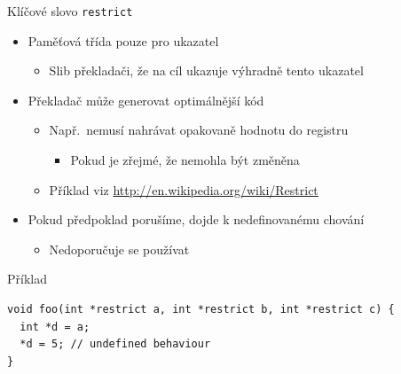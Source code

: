 \begin{frame}[fragile]{Klíčové slovo \texttt{restrict}}

  \begin{itemize}
    \item Paměťová třída pouze pro ukazatel
    \begin{itemize}
      \item Slib překladači, že na cíl ukazuje výhradně tento ukazatel
    \end{itemize}

    \pause

    \item Překladač může generovat optimálnější kód
    \begin{itemize}
      \item Např.\ nemusí nahrávat opakovaně hodnotu do registru
      \begin{itemize}
	\item Pokud je zřejmé, že nemohla být změněna
      \end{itemize}

      \item Příklad viz \url{http://en.wikipedia.org/wiki/Restrict}
    \end{itemize}

    \pause

    \item Pokud předpoklad porušíme, dojde k nedefinovanému chování
    \begin{itemize}
      \item Nedoporučuje se používat
    \end{itemize}

  \end{itemize}


\begin{block}{Příklad}
\begin{lstlisting}
void foo(int *restrict a, int *restrict b, int *restrict c) {
  int *d = a;
  *d = 5; // undefined behaviour
}
\end{lstlisting}
\end{block}

\end{frame}

